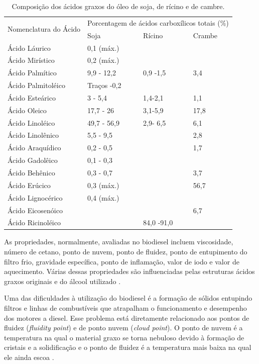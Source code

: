 \begin{table}[H]
\centering
\caption{Composição dos ácidos graxos do óleo de soja, de rícino e de cambre.}
\begin{tabular}{lp{2.5cm}p{2.5cm}p{2.5cm}}
\hline
\multirow{2}{*}{Nomenclatura do Ácido} & \multicolumn{3}{l}{Porcentagem de ácidos carboxílicos totais (\%)}  \\
    & Soja  & Rícino & Crambe  \\
    \hline
     Ácido Láurico      & 0,1 (máx.)  &  & \\
     Ácido Mirístico    & 0,2 (máx.)  &  &  \\
     Ácido Palmítico    & 9,9 - 12,2  & 0,9 -1,5 & 3,4  \\
     Ácido Palmitoléico & Traços -0,2 &  &  \\
     Ácido Esteárico    & 3 - 5,4     & 1,4-2,1  & 1,1 \\
     Ácido Oleico       & 17,7 - 26   & 3,1-5,9 & 17,8 \\
     Ácido Linoléico    & 49,7 - 56,9 & 2,9- 6,5 & 6,1 \\
     Ácido Linolênico   & 5,5 - 9,5   &  & 2,8 \\
     Ácido Araquídico   & 0,2 - 0,5   &  & 1,7 \\
     Ácido Gadolêico    & 0,1 - 0,3   &  &  \\
     Ácido Behênico     & 0,3 - 0,7   &  & 3,7 \\
     Ácido Erúcico      & 0,3 (máx.)  &  & 56,7 \\
     Ácido Lignocérico  & 0,4 (máx.)  &  &  \\
     Ácido Eicosenóico  &             &  & 6,7 \\
     Ácido Ricinoléico  &             & 84,0 -91,0 &  \\
     \hline
\end{tabular}
\label{tab:angelica}
\end{table}

As propriedades, normalmente, avaliadas no biodiesel incluem viscosidade, número de cetano, ponto de nuvem, ponto de fluidez, ponto de entupimento do filtro frio, gravidade específica, ponto de inflamação, valor de iodo e valor de aquecimento. Várias dessas propriedades são influenciadas pelas estruturas ácidos graxos originais e do álcool utilizado \cite{Hoekman2012,Knothe2005}.

Uma das dificuldades à utilização do biodiesel é a formação de sólidos entupindo filtros e linhas de combustíveis que atrapalham o funcionamento e desempenho dos motores a diesel. Esse problema está diretamente relacionado aos pontos de fluidez (\textit{fluidity point}) e de ponto nuvem (\textit{cloud point}). O ponto de nuvem é a temperatura na qual o material graxo se torna nebuloso devido à formação de cristais e a solidificação e o ponto de fluidez é a temperatura mais baixa na qual ele ainda escoa \cite{Knothe2005}. 

